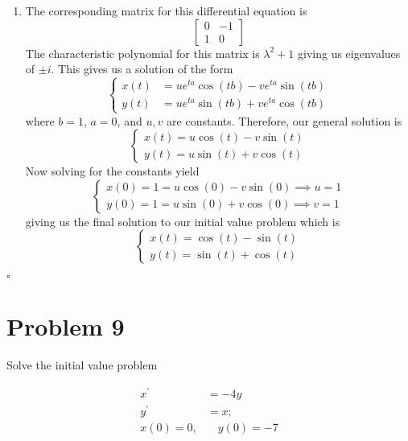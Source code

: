 \documentclass[11pt]{article}
\newenvironment{proof}{\noindent{\bf Proof.}}{\hfill $\square$\medskip}
\begin{document}
\begin{proof}
    \begin{enumerate}[label=(\alph*)]
        \item The corresponding matrix for this differential equation is
        $$\begin{bmatrix}
            0&-1\\
            1&0
        \end{bmatrix}$$
        The characteristic polynomial for this matrix is $\lambda^{2}+1$ giving us eigenvalues of
        $\pm i$. This gives us a solution of the form
        $$\begin{cases}
            x(t)&=ue^{ta}\cos(tb)-ve^{ta}\sin(tb)\\
            y(t)&=ue^{ta}\sin(tb)+ve^{ta}\cos(tb)
        \end{cases}$$
        where $b=1$, $a=0$, and $u,v$ are constants. Therefore, our general solution is
        $$\begin{cases}
            x(t)=u\cos(t)-v\sin(t)\\
            y(t)=u\sin(t)+v\cos(t)
        \end{cases}$$
        Now solving for the constants yield
        $$\begin{cases}
            x(0)=1=u\cos(0)-v\sin(0)\implies u=1\\
            y(0)=1=u\sin(0)+v\cos(0)\implies v=1
        \end{cases}$$
        giving us the final solution to our initial value problem which is
        $$\begin{cases}
            x(t)=\cos(t)-\sin(t)\\
            y(t)=\sin(t)+\cos(t)
        \end{cases}$$
    \end{enumerate}
\end{proof}

\section{Problem 9}
Solve the initial value problem

\begin{equation}
    \begin{split}
        x^{\prime}&=-4y\\
        y^{\prime}&=x;\\
        x(0)=0,&\quad y(0)=-7
    \end{split}
\end{equation}
\end{document}
